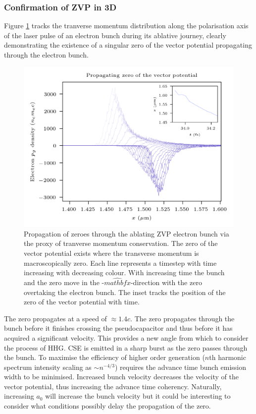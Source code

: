 \subsubsection{Confirmation of ZVP in 3D}
Figure \ref{fig:zvppropagatingzero} tracks the tranverse momentum distribution along the polarisation axis of the laser pulse of an electron bunch during its ablative journey, clearly demonstrating the existence of a singular zero of the vector potential propagating through the electron bunch.
\begin{figure}
	\centering
	\includegraphics[width=0.7\linewidth]{figures/zvp/zvp_propagating_zero}
	\caption[Propagation of zeroes through the ablating ZVP electron bunch.]{Propagation of zeroes through the ablating ZVP electron bunch via the proxy of tranverse momentum conservation. The zero of the vector potential exists where the transverse momentum is macroscopically zero. Each line represents a timestep with time increasing with decreasing colour. With increasing time the bunch and the zero move in the -$\hat{mathbf{x}}$-direction with the zero overtaking the electron bunch. The inset tracks the position of the zero of the vector potential with time.}
	\label{fig:zvppropagatingzero}
\end{figure}
The zero propagates at a speed of $\approx 1.4c$. The zero propagates through the bunch before it finishes crossing the pseudocapacitor and thus before it has acquired a significant velocity. This provides a new angle from which to consider the process of \ac{HHG}. \ac{CSE} is emitted in a sharp burst as the zero passes through the bunch. To maximise the efficiency of higher order generation ($n$th harmonic spectrum intensity scaling as $\sim n^{-4/3}$) requires the advance time bunch emission width to be minimised. Increased bunch velocity decreases the velocity of the vector potential, thus increasing the advance time coherency. Naturally, increasing $a_0$ will increase the bunch velocity but it could be interesting to consider what conditions possibly delay the propagation of the zero.

